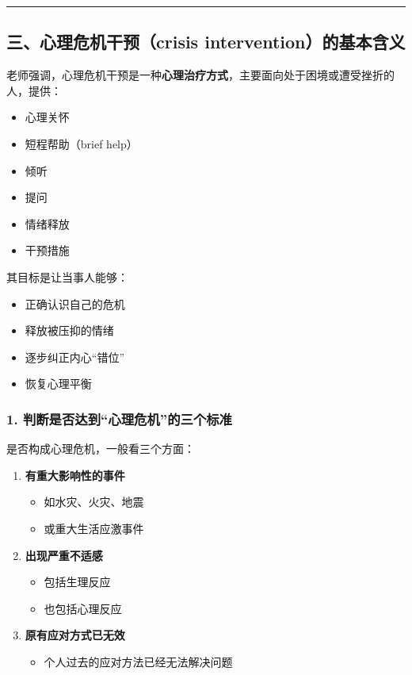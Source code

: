 \documentclass[
  chinese,
  9pt,
  a4paper,
]{ctexart}
\providecommand{\tightlist}{%
  \setlength{\itemsep}{0pt}\setlength{\parskip}{0pt}}
\begin{document}
\begin{center}\rule{0.5\linewidth}{0.5pt}\end{center}

\subsection{三、心理危机干预（crisis
intervention）的基本含义}\label{ux4e09ux5fc3ux7406ux5371ux673aux5e72ux9884crisis-interventionux7684ux57faux672cux542bux4e49}

老师强调，心理危机干预是一种\textbf{心理治疗方式}，主要面向处于困境或遭受挫折的人，提供：

\begin{itemize}
\tightlist
\item
  心理关怀
\item
  短程帮助（brief help）
\item
  倾听
\item
  提问
\item
  情绪释放
\item
  干预措施
\end{itemize}

其目标是让当事人能够：

\begin{itemize}
\tightlist
\item
  正确认识自己的危机
\item
  释放被压抑的情绪
\item
  逐步纠正内心``错位''
\item
  恢复心理平衡
\end{itemize}

\subsubsection{1.
判断是否达到``心理危机''的三个标准}\label{ux5224ux65adux662fux5426ux8fbeux5230ux5fc3ux7406ux5371ux673aux7684ux4e09ux4e2aux6807ux51c6}

是否构成心理危机，一般看三个方面：

\begin{enumerate}
\def\labelenumi{\arabic{enumi}.}
\item
  \textbf{有重大影响性的事件}

  \begin{itemize}
  \tightlist
  \item
    如水灾、火灾、地震
  \item
    或重大生活应激事件
  \end{itemize}
\item
  \textbf{出现严重不适感}

  \begin{itemize}
  \tightlist
  \item
    包括生理反应
  \item
    也包括心理反应
  \end{itemize}
\item
  \textbf{原有应对方式已无效}

  \begin{itemize}
  \tightlist
  \item
    个人过去的应对方法已经无法解决问题
  \end{itemize}
\end{enumerate}
\end{document}
